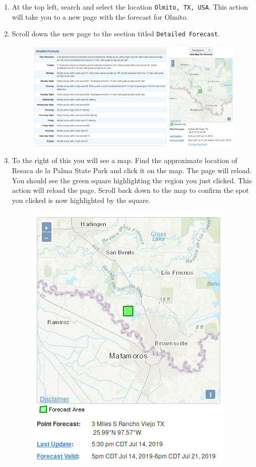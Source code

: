 \documentclass{article}
\begin{document}
\begin{enumerate}
				\begin{enumerate}
		
					\item At the top left, search and select the location \texttt{Olmito, TX, USA}. This action will take you to a new page with the forecast for Olmito.		
		
					\item Scroll down the new page to the section titled \texttt{Detailed Forecast}.
		
					\begin{figure}[h]
						\centering
						\includegraphics[scale=0.2]{detailed_forecast.png}
					\end{figure}
	
					\item To the right of this you will see a map. Find the approximate location of Resaca de la Palma State Park and click it on the map. The page will reload. You should see the green square highlighting the region you just clicked. This action will reload the page. Scroll back down to the map to confirm the spot you clicked is now highlighted by the square.
		
					\begin{figure}[h]
						\centering
						\includegraphics[scale=0.3]{green_square.png}
					\end{figure}
		

\end{enumerate}
\end{enumerate}
\end{document}
